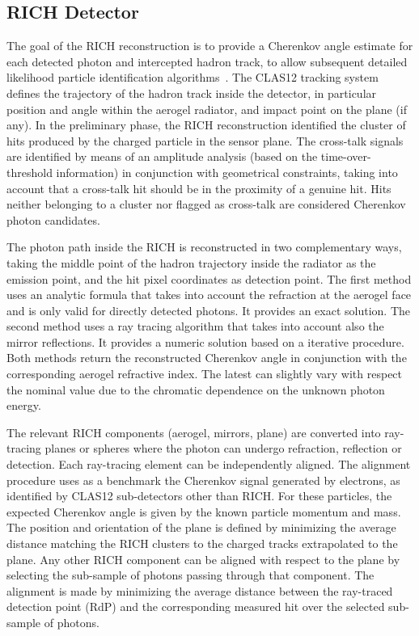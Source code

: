 \subsection{RICH Detector}

The goal of the RICH reconstruction is to provide a Cherenkov angle estimate for each detected photon and intercepted hadron track, to allow subsequent detailed likelihood particle identification algorithms~\cite{rich-nim}. The CLAS12 tracking system defines the trajectory of the hadron track inside the detector, in particular position and angle within the aerogel radiator, and impact point on the \MaPMT plane (if any). In the preliminary phase, the RICH reconstruction identified the cluster of hits produced by the charged particle in the sensor plane. The cross-talk signals are identified by means of an amplitude analysis (based on the time-over-threshold information) in conjunction with geometrical constraints, taking into account that a cross-talk hit should be in the proximity of a genuine hit. Hits neither belonging to a cluster nor flagged as cross-talk are considered Cherenkov photon candidates. 

The photon path inside the RICH is reconstructed in two complementary ways, taking the middle point of the hadron trajectory inside the radiator as the emission point, and the hit pixel coordinates as detection point. The first method uses an analytic formula that takes into account the refraction at the aerogel face and is only valid for directly detected photons. It provides an exact solution. The second method uses a ray tracing algorithm that takes into account also the mirror reflections. It provides a numeric solution based on a iterative procedure. Both methods return the reconstructed Cherenkov angle in conjunction with the corresponding aerogel refractive index. The latest can slightly vary with respect the nominal value due to the chromatic dependence on the unknown photon energy.

The relevant RICH components (aerogel, mirrors, \MaPMT plane) are converted into ray-tracing planes or spheres where the photon can undergo refraction, reflection or detection. Each ray-tracing element can be independently aligned. The alignment procedure uses as a benchmark the Cherenkov signal generated by electrons, as identified by CLAS12 sub-detectors other than RICH. For these particles, the expected Cherenkov angle is given by the known particle momentum and mass. The position and orientation of the \MaPMT plane is defined by minimizing the average distance matching the RICH clusters to the charged tracks extrapolated to the \MaPMT plane. Any other RICH component can be aligned with respect to the \MaPMT plane by selecting the sub-sample of photons passing through that component. The alignment is made by minimizing the average distance between the ray-traced detection point (RdP) and the corresponding measured \MaPMT hit over the selected sub-sample of photons.

